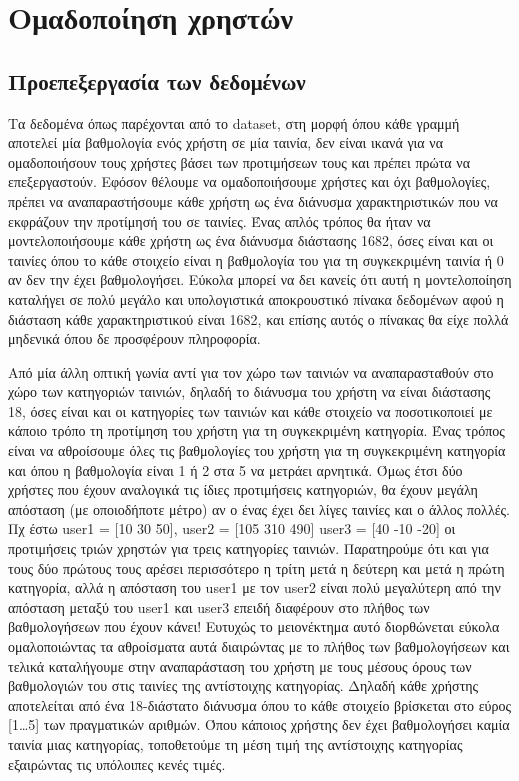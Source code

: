 \section{Ομαδοποίηση χρηστών}
\subsection{Προεπεξεργασία των δεδομένων}
Τα δεδομένα όπως παρέχονται από το dataset, στη μορφή όπου κάθε γραμμή αποτελεί μία βαθμολογία ενός χρήστη σε μία ταινία, δεν είναι ικανά για να ομαδοποιήσουν τους χρήστες βάσει των προτιμήσεων τους και πρέπει πρώτα να επεξεργαστούν.
Εφόσον θέλουμε να ομαδοποιήσουμε χρήστες και όχι βαθμολογίες, πρέπει να αναπαραστήσουμε κάθε χρήστη ως ένα διάνυσμα χαρακτηριστικών που να εκφράζουν την προτίμησή του σε ταινίες.
Ένας απλός τρόπος θα ήταν να μοντελοποιήσουμε κάθε χρήστη ως ένα διάνυσμα διάστασης 1682, όσες είναι και οι ταινίες όπου το κάθε στοιχείο είναι η βαθμολογία του για τη συγκεκριμένη ταινία ή 0 αν δεν την έχει βαθμολογήσει.
Εύκολα μπορεί να δει κανείς ότι αυτή η μοντελοποίηση καταλήγει σε πολύ μεγάλο και υπολογιστικά αποκρουστικό πίνακα δεδομένων αφού η διάσταση κάθε χαρακτηριστικού είναι 1682, και επίσης αυτός ο πίνακας θα είχε πολλά μηδενικά όπου δε προσφέρουν πληροφορία.

Από μία άλλη οπτική γωνία αντί για τον χώρο των ταινιών να αναπαρασταθούν στο χώρο των κατηγοριών ταινιών, δηλαδή το διάνυσμα του χρήστη να είναι διάστασης 18, όσες είναι και οι κατηγορίες των ταινιών και κάθε στοιχείο να ποσοτικοποιεί με κάποιο τρόπο τη προτίμηση του χρήστη για τη συγκεκριμένη κατηγορία.
Ένας τρόπος είναι να αθροίσουμε όλες τις βαθμολογίες του χρήστη για τη συγκεκριμένη κατηγορία και όπου η βαθμολογία είναι 1 ή 2 στα 5 να μετράει αρνητικά.
Όμως έτσι δύο χρήστες που έχουν αναλογικά τις ίδιες προτιμήσεις κατηγοριών, θα έχουν μεγάλη απόσταση (με οποιοδήποτε μέτρο) αν ο ένας έχει δει λίγες ταινίες και ο άλλος πολλές.
Πχ έστω user1 = [10 30 50], user2 =  [105 310 490] user3 = [40 -10 -20] οι προτιμήσεις τριών χρηστών για τρεις κατηγορίες ταινιών.
Παρατηρούμε ότι και για τους δύο πρώτους τους αρέσει περισσότερο η τρίτη μετά η δεύτερη και μετά η πρώτη κατηγορία, αλλά η απόσταση του user1 με τον user2 είναι πολύ μεγαλύτερη από την απόσταση μεταξύ του user1 και user3 επειδή διαφέρουν στο πλήθος των βαθμολογήσεων που έχουν κάνει! Ευτυχώς το μειονέκτημα αυτό διορθώνεται εύκολα ομαλοποιώντας τα αθροίσματα αυτά διαιρώντας με το πλήθος των βαθμολογήσεων και τελικά καταλήγουμε στην αναπαράσταση του χρήστη με τους μέσους όρους των βαθμολογιών του στις ταινίες της αντίστοιχης κατηγορίας.
Δηλαδή κάθε χρήστης αποτελείται από ένα 18-διάστατο διάνυσμα όπου το κάθε στοιχείο βρίσκεται στο εύρος [1\ldots5] των πραγματικών αριθμών.
Όπου κάποιος χρήστης δεν έχει βαθμολογήσει καμία ταινία μιας κατηγορίας, τοποθετούμε τη μέση τιμή της αντίστοιχης κατηγορίας εξαιρώντας τις υπόλοιπες κενές τιμές.

